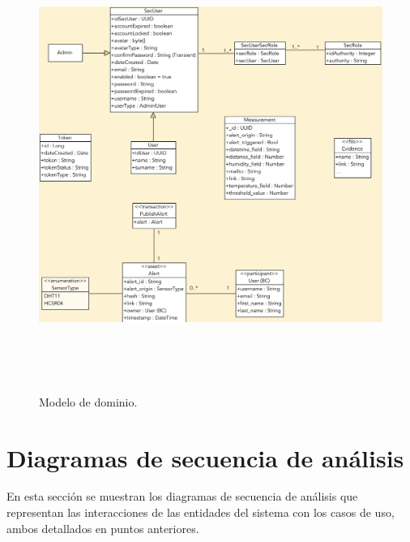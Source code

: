 \documentclass[12pt,a4paper, twoside]{report}
\begin{document}
	\begin{figure}[!ht]   
		\caption{Modelo de dominio.} 
		\begin{center} 
	 		\includegraphics[width=17cm,height=14cm]{Images/analysis/classDiagram} \\
			\label{fig:domain_model} 
		\end{center}  
	\end{figure}  
	
	\section{Diagramas de secuencia de análisis}
		
	En esta sección se muestran los diagramas de secuencia de análisis que representan las interacciones de las entidades del sistema con los casos de uso, ambos detallados en puntos anteriores.
			
\end{document}
